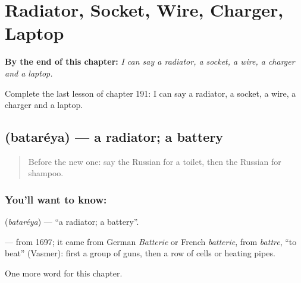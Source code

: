 
\chapter{Radiator, Socket, Wire, Charger, Laptop}
\label{ch:ru-radiator-socket-wire-charger-laptop}

\begin{chapteropening}
\textbf{By the end of this chapter:} \emph{I can say a radiator, a socket, a wire, a charger and a laptop.}

Complete the last lesson of chapter 191: I can say a radiator, a socket, a wire, a charger and a laptop.
\end{chapteropening}

\section[\texorpdfstring{\ru{батарея} (bataréya)}{батарея (bataréya)}]{ (bataréya) — a radiator; a battery}

\label{lesson:RU-C191-batareya}



\begin{quote}
Before the new one: say the Russian for a toilet, then the Russian for shampoo.
\end{quote}

\subsection*{You'll want to know: }
\textbf{} (\emph{bataréya}) — \textquotedblleft{}a radiator; a battery\textquotedblright{}.

\begin{cousinweb}
\textbf{} — from 1697; it came from German \emph{Batterie} or French \emph{batterie}, from \emph{battre}, \textquotedblleft{}to beat\textquotedblright{} (Vasmer): first a group of guns, then a row of cells or heating pipes.
\end{cousinweb}

\begin{grammarlens}[title={What you've built}]
One more word for this chapter.
\end{grammarlens}


